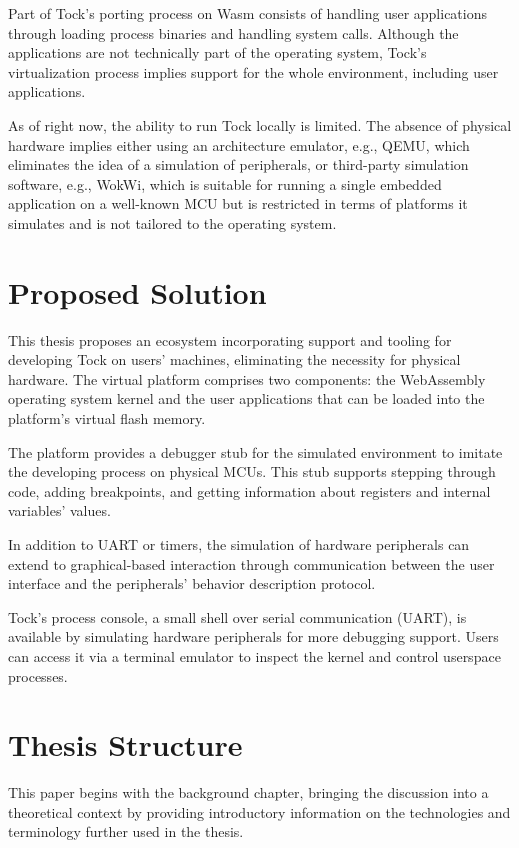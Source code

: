\documentclass[12pt,a4paper]{report}
\begin{document}
Part of Tock's porting process on Wasm consists of handling user applications through loading process binaries and handling system calls. Although the applications are not technically part of the operating system, Tock's virtualization process implies support for the whole environment, including user applications.

As of right now, the ability to run Tock locally is limited. The absence of physical hardware implies either using an architecture emulator, e.g., QEMU, which eliminates the idea of a simulation of peripherals, or third-party simulation software, e.g., WokWi, which is suitable for running a single embedded application on a well-known MCU but is restricted in terms of platforms it simulates and is not tailored to the operating system.

\section{Proposed Solution}

This thesis proposes an ecosystem incorporating support and tooling for developing Tock on users' machines, eliminating the necessity for physical hardware. The virtual platform comprises two components: the WebAssembly operating system kernel and the user applications that can be loaded into the platform's virtual flash memory.

The platform provides a debugger stub for the simulated environment to imitate the developing process on physical MCUs. This stub supports stepping through code, adding breakpoints, and getting information about registers and internal variables' values.

In addition to UART or timers, the simulation of hardware peripherals can extend to graphical-based interaction through communication between the user interface and the peripherals' behavior description protocol.

Tock's process console, a small shell over serial communication (UART), is available by simulating hardware peripherals for more debugging support. Users can access it via a terminal emulator to inspect the kernel and control userspace processes.

\section{Thesis Structure}

This paper begins with the background chapter, bringing the discussion into a theoretical context by providing introductory information on the technologies and terminology further used in the thesis.
\end{document}
